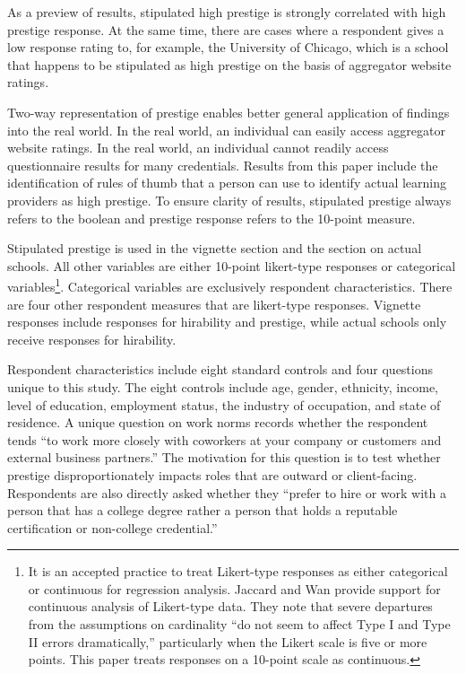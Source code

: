 \documentclass[review]{elsarticle}
\begin{document}
As a preview of results, stipulated high prestige is strongly correlated with high prestige response.
At the same time, there are cases where a respondent gives a low response rating to,
for example, the University of Chicago,
which is a school that happens to be stipulated as high prestige on the basis of aggregator website ratings.

Two-way representation of prestige enables better general application of findings into the real world.
In the real world, an individual can easily access aggregator website ratings.
In the real world, an individual cannot readily access questionnaire results for many credentials.
Results from this paper include the identification of rules of thumb
that a person can use to identify actual learning providers as high prestige.
To ensure clarity of results,
stipulated prestige always refers to the boolean and prestige response refers to the 10-point measure.

Stipulated prestige is used in the vignette section and the section on actual schools.
All other variables are either 10-point likert-type responses or categorical variables\footnote{
    It is an accepted practice to treat Likert-type responses as either categorical or continuous for regression analysis.
    Jaccard and Wan provide support for continuous analysis of Likert-type data.
    They note that severe departures from the assumptions on cardinality ``do not seem to affect Type I and Type II errors dramatically,''
    particularly when the Likert scale is five or more points\cite{jaccard1996lisrel}.
    This paper treats responses on a 10-point scale as continuous.
}.
Categorical variables are exclusively respondent characteristics.
There are four other respondent measures that are likert-type responses.
Vignette responses include responses for hirability and prestige,
while actual schools only receive responses for hirability.

Respondent characteristics include eight standard controls and four questions unique to this study.
The eight controls include
age, gender, ethnicity, income,
level of education, employment status, the industry of occupation, and state of residence.
A unique question on work norms records whether the respondent tends ``to work more closely with coworkers at your company or customers and external business partners.''
The motivation for this question is to test whether prestige disproportionately impacts roles that are outward or client-facing.
Respondents are also directly asked whether they
``prefer to hire or work with a person that has a college degree rather a person that holds a reputable certification or non-college credential.''
\end{document}
